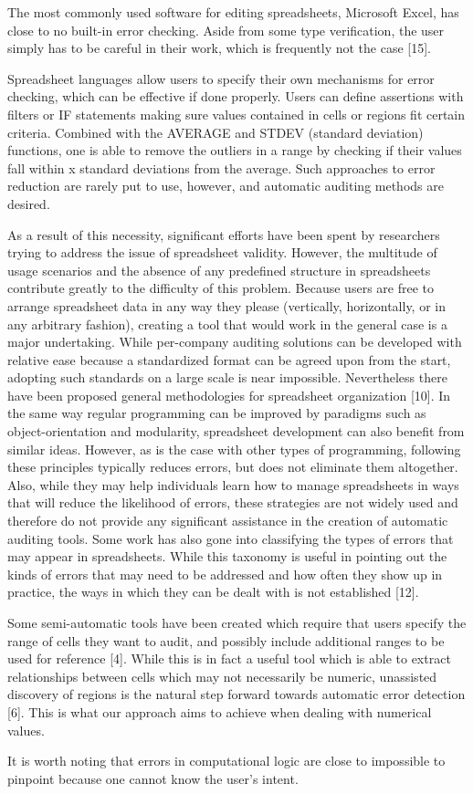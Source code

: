 The most commonly used software for editing spreadsheets, Microsoft
Excel, has close to no built-in error checking. Aside from some type
verification, the user simply has to be careful in their work, which
is frequently not the case [15].

Spreadsheet languages allow users to specify their own mechanisms for
error checking, which can be effective if done properly. Users can
define assertions with filters or IF statements making sure values
contained in cells or regions fit certain criteria. Combined with the
AVERAGE and STDEV (standard deviation) functions, one is able to
remove the outliers in a range by checking if their values fall within
x standard deviations from the average. Such approaches to error
reduction are rarely put to use, however, and automatic auditing
methods are desired.

As a result of this necessity, significant efforts have been spent by
researchers trying to address the issue of spreadsheet
validity. However, the multitude of usage scenarios and the absence of
any predefined structure in spreadsheets contribute greatly to the
difficulty of this problem. Because users are free to arrange
spreadsheet data in any way they please (vertically, horizontally, or
in any arbitrary fashion), creating a tool that would work in the
general case is a major undertaking. While per-company auditing
solutions can be developed with relative ease because a standardized
format can be agreed upon from the start, adopting such standards on a
large scale is near impossible. Nevertheless there have been proposed
general methodologies for spreadsheet organization [10]. In the same
way regular programming can be improved by paradigms such as
object-orientation and modularity, spreadsheet development can also
benefit from similar ideas. However, as is the case with other types
of programming, following these principles typically reduces errors,
but does not eliminate them altogether. Also, while they may help
individuals learn how to manage spreadsheets in ways that will reduce
the likelihood of errors, these strategies are not widely used and
therefore do not provide any significant assistance in the creation of
automatic auditing tools.  Some work has also gone into classifying
the types of errors that may appear in spreadsheets. While this
taxonomy is useful in pointing out the kinds of errors that may need
to be addressed and how often they show up in practice, the ways in
which they can be dealt with is not established [12].

Some semi-automatic tools have been created which require that users
specify the range of cells they want to audit, and possibly include
additional ranges to be used for reference [4]. While this is in fact
a useful tool which is able to extract relationships between cells
which may not necessarily be numeric, unassisted discovery of regions
is the natural step forward towards automatic error detection
[6]. This is what our approach aims to achieve when dealing with
numerical values.

It is worth noting that errors in computational logic are close to
impossible to pinpoint because one cannot know the user's intent.
